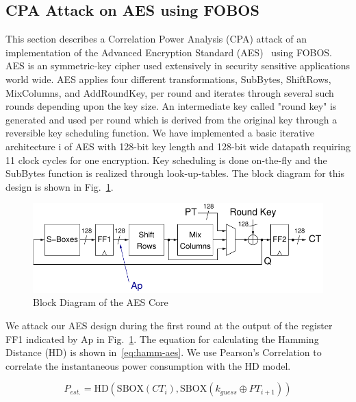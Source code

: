 \documentclass{llncs}
\numberwithin{algorithm}{chapter}
\begin{document}
\subsection{CPA Attack on AES using FOBOS}

This section describes a Correlation Power Analysis (CPA) attack of an implementation of the
Advanced Encryption Standard (AES)~\cite{146} using FOBOS. 
AES is an symmetric-key cipher used extensively
in security sensitive applications world wide. AES applies four different transformations,
SubBytes, ShiftRows, MixColumns, and AddRoundKey, per round and iterates through several 
such rounds depending upon the key size. An intermediate key called 
"round key" is generated and used per round which is derived from the original key through 
a reversible key scheduling function. We have implemented a basic iterative architecture i
of AES with 128-bit 
key length and 128-bit wide datapath requiring 11 clock cycles for one encryption.
Key scheduling is done on-the-fly and the SubBytes function is realized through look-up-tables.
The block diagram for this design is shown in Fig.~\ref{fig:fobos-aes128}.

\begin{figure}[ht]
\begin{center}
\includegraphics[scale=0.8]{figures/aes128}
\caption{Block Diagram of the AES Core}\label{fig:fobos-aes128}
\end{center} 
\vspace{-3ex}
\end{figure}

We attack our AES design during the first round at the output of the register \textsf{FF1} 
indicated by \textsf{Ap} in Fig.~\ref{fig:fobos-aes128}.
The equation for calculating the Hamming Distance (HD) is shown 
in~\ref{eq:hamm-aes}. We use Pearson's Correlation to correlate the instantaneous
power consumption with the HD model. 

\begin{equation}\label{eq:hamm-aes}%
P_{est.} = \mathrm{HD}(\mathrm{SBOX}(CT_{i}), \mathrm{SBOX}(k_{guess} \oplus PT_{i+1}))
\end{equation}
\end{document}
